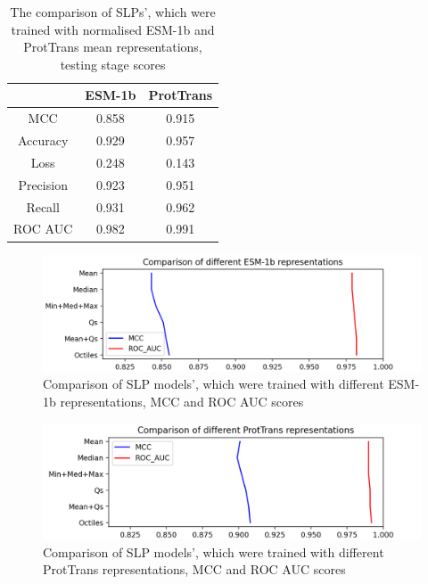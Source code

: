 \documentclass[12pt]{article}
\begin{document}
	\begin{table}[h!]
		\caption{The comparison of SLPs', which were 
		trained with normalised ESM-1b and ProtTrans mean 
		representations, testing stage scores}
		\vspace{0.2cm}
		\centering
		\begin{tabular}{ | c | c c | }
			\hline 	
			& ESM-1b & ProtTrans \\
			\hline 
			MCC & 0.858 & 0.915 \\
			Accuracy & 0.929 & 0.957 \\
			Loss & 0.248 & 0.143 \\
			Precision & 0.923 & 0.951 \\
			Recall & 0.931 & 0.962 \\
			ROC AUC & 0.982 & 0.991 \\
			\hline    
		\end{tabular}
		\label{table:normalisedESMAndPTScores}
	\end{table}


	\begin{figure}[h!]
		\centering
		\includegraphics[scale=0.7]{SLP_ESM_003_diff_representations.png}

		\caption{Comparison of SLP models', which were trained with different
		ESM-1b representations, MCC and ROC AUC scores}
		\label{figure:scoresRepresentationsESM}
	\end{figure}

	\begin{figure}[h!]
		\centering
		\includegraphics[scale=0.7]{SLP_PT_003_diff_representations.png}

		\caption{Comparison of SLP models', which were trained with different
		ProtTrans representations, MCC and ROC AUC scores}
		\label{figure:scoresRepresentationsPT}
	\end{figure}
\end{document}
